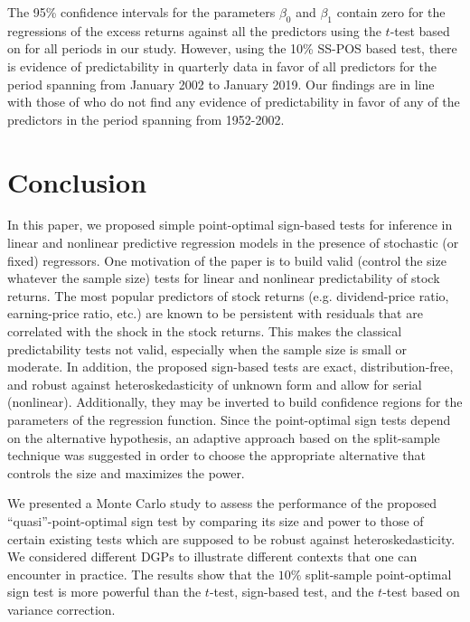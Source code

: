\documentclass[harvard,11pt]{article}
\begin{document}
The 95\% confidence intervals for the parameters $\beta_0$ and $\beta_1$ contain zero for the regressions of the excess returns against all the predictors using the $t$-test based on \citet{white1980heteroskedasticity} for all periods in our study. However, using the 10\% SS-POS based test, there is evidence of predictability in quarterly data in favor of all predictors for the period spanning from January 2002 to January 2019. Our findings are in line with those of \citet{campbell2006efficient} who do not find any evidence of predictability in favor of any of the predictors in the period spanning from 1952-2002. 


\FloatBarrier
\section{Conclusion \label{ConclusionC1}}

In this paper, we proposed simple point-optimal sign-based tests for inference in linear
and nonlinear predictive regression models in the presence of stochastic (or fixed) regressors.
One motivation of the paper is to build valid (control the size whatever the
sample size) tests for linear and nonlinear predictability of stock returns.
The most popular predictors of stock returns (e.g. dividend-price ratio,
earning-price ratio, etc.) are known to be persistent with residuals that are correlated with
the shock in the stock returns. This makes the classical predictability tests
not valid, especially when the sample size is small or moderate. In
addition, the proposed sign-based tests are exact, distribution-free, and
robust against heteroskedasticity of unknown form and allow for serial (nonlinear). Additionally, they may be inverted to build
confidence regions for the parameters of the regression function. Since the
point-optimal sign tests depend on the alternative hypothesis, an adaptive
approach based on the split-sample technique was suggested in order to choose
the appropriate alternative that controls the size and maximizes the power.

We presented a Monte Carlo study to assess the performance of the proposed
\textquotedblleft quasi\textquotedblright -point-optimal sign test by
comparing its size and power to those of certain existing tests which are
supposed to be robust against heteroskedasticity. We considered different
DGPs to illustrate different contexts that one can encounter in practice.
The results show that the $10\%$ split-sample point-optimal sign test is
more powerful than the $t$-test, \citet{dufour1995exact} sign-based test,
and the $t$-test based on \citet{white1980heteroskedasticity} variance correction.
\end{document}
